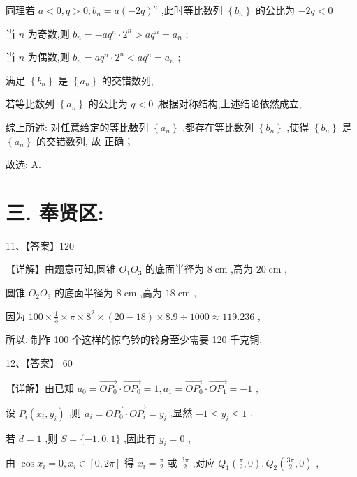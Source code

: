\documentclass[10pt]{article}
\newcommand*\circled[1]{\tikz[baseline=(char.base)]{\node[shape=circle,draw,inner sep=1.5pt] (char) {\small #1};}}
\begin{document}
同理若 \(a < 0,q > 0,{b}_{n} = a{\left( -2q\right) }^{n}\) ,此时等比数列 \(\left\{  {b}_{n}\right\}\) 的公比为 \(- {2q} < 0\)

当 \(n\) 为奇数,则 \({b}_{n} =  - a{q}^{n} \cdot  {2}^{n} > a{q}^{n} = {a}_{n}\) ;

当 \(n\) 为偶数,则 \({b}_{n} = a{q}^{n} \cdot  {2}^{n} < a{q}^{n} = {a}_{n}\) ;

满足 \(\left\{  {b}_{n}\right\}\) 是 \(\left\{  {a}_{n}\right\}\) 的交错数列,

若等比数列 \(\left\{  {a}_{n}\right\}\) 的公比为 \(q < 0\) ,根据对称结构,上述结论依然成立,

综上所述: 对任意给定的等比数列 \(\left\{  {a}_{n}\right\}\) ,都存在等比数列 \(\left\{  {b}_{n}\right\}\) ,使得 \(\left\{  {b}_{n}\right\}\) 是 \(\left\{  {a}_{n}\right\}\) 的交错数列, 故 \circled{2} 正确；

故选: A.

\section*{三. 奉贤区:}

11、【答案】120

【详解】由题意可知,圆锥 \({O}_{1}{O}_{3}\) 的底面半径为 \(8\mathrm{\;{cm}}\) ,高为 \({20}\mathrm{\;{cm}}\) ,

圆锥 \({O}_{2}{O}_{3}\) 的底面半径为 \(8\mathrm{\;{cm}}\) ,高为 \({18}\mathrm{\;{cm}}\) ,

因为 \({100} \times  \frac{1}{3} \times  \pi  \times  {8}^{2} \times  \left( {{20} - {18}}\right)  \times  {8.9} \div  {1000} \approx  {119.236}\) ,

所以, 制作 100 个这样的惊鸟铃的铃身至少需要 120 千克铜.

12、【答案】 60

【详解】由已知 \({a}_{0} = \overrightarrow{O{P}_{0}} \cdot  \overrightarrow{O{P}_{0}} = 1,{a}_{1} = \overrightarrow{O{P}_{0}} \cdot  \overrightarrow{O{P}_{1}} =  - 1\) ,

设 \({P}_{i}\left( {{x}_{i},{y}_{i}}\right)\) ,则 \({a}_{i} = \overrightarrow{O{P}_{0}} \cdot  \overrightarrow{O{P}_{i}} = {y}_{i}\) ,显然 \(- 1 \leq  {y}_{i} \leq  1\) ,

若 \(d = 1\) ,则 \(S = \{  - 1,0,1\}\) ,因此有 \({y}_{i} = 0\) ,

由 \(\cos {x}_{i} = 0,{x}_{i} \in  \left\lbrack  {0,{2\pi }}\right\rbrack\) 得 \({x}_{i} = \frac{\pi }{2}\) 或 \(\frac{3\pi }{2}\) ,对应 \({Q}_{1}\left( {\frac{\pi }{2},0}\right) ,{Q}_{2}\left( {\frac{3\pi }{2},0}\right)\) ,
\end{document}
